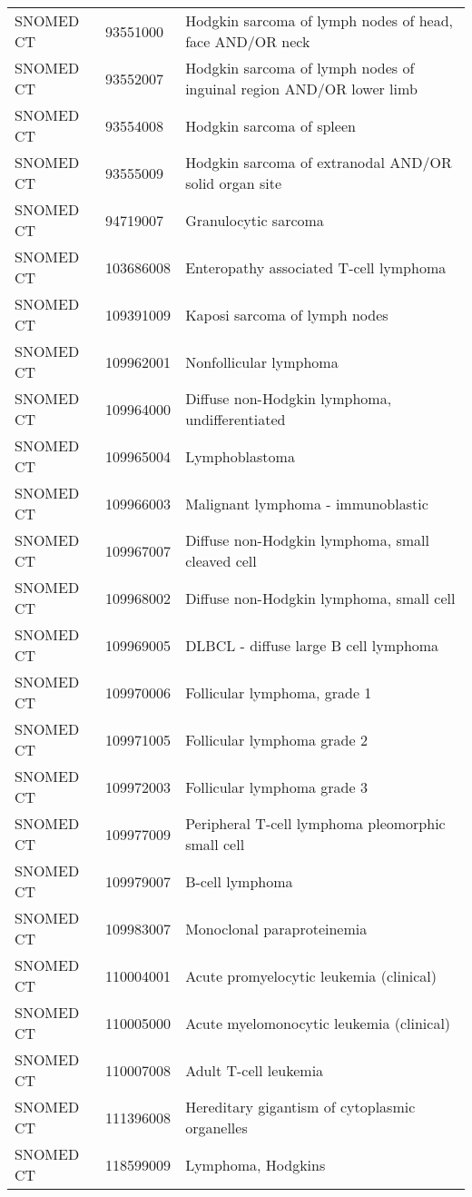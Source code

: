 \begin{longtable}{p{}p{}p{}}
  SNOMED CT & 93551000 & Hodgkin sarcoma of lymph nodes of head, face AND/OR neck \\ 
  SNOMED CT & 93552007 & Hodgkin sarcoma of lymph nodes of inguinal region AND/OR lower limb \\ 
  SNOMED CT & 93554008 & Hodgkin sarcoma of spleen \\ 
  SNOMED CT & 93555009 & Hodgkin sarcoma of extranodal AND/OR solid organ site \\ 
  SNOMED CT & 94719007 & Granulocytic sarcoma \\ 
  SNOMED CT & 103686008 & Enteropathy associated T-cell lymphoma \\ 
  SNOMED CT & 109391009 & Kaposi sarcoma of lymph nodes \\ 
  SNOMED CT & 109962001 & Nonfollicular lymphoma \\ 
  SNOMED CT & 109964000 & Diffuse non-Hodgkin lymphoma, undifferentiated \\ 
  SNOMED CT & 109965004 & Lymphoblastoma \\ 
  SNOMED CT & 109966003 & Malignant lymphoma - immunoblastic \\ 
  SNOMED CT & 109967007 & Diffuse non-Hodgkin lymphoma, small cleaved cell \\ 
  SNOMED CT & 109968002 & Diffuse non-Hodgkin lymphoma, small cell \\ 
  SNOMED CT & 109969005 & DLBCL - diffuse large B cell lymphoma \\ 
  SNOMED CT & 109970006 & Follicular lymphoma, grade 1 \\ 
  SNOMED CT & 109971005 & Follicular lymphoma grade 2 \\ 
  SNOMED CT & 109972003 & Follicular lymphoma grade 3 \\ 
  SNOMED CT & 109977009 & Peripheral T-cell lymphoma pleomorphic small cell \\ 
  SNOMED CT & 109979007 & B-cell lymphoma \\ 
  SNOMED CT & 109983007 & Monoclonal paraproteinemia \\ 
  SNOMED CT & 110004001 & Acute promyelocytic leukemia (clinical) \\ 
  SNOMED CT & 110005000 & Acute myelomonocytic leukemia (clinical) \\ 
  SNOMED CT & 110007008 & Adult T-cell leukemia \\ 
  SNOMED CT & 111396008 & Hereditary gigantism of cytoplasmic organelles \\ 
  SNOMED CT & 118599009 & Lymphoma, Hodgkins \\ 

\end{longtable}
